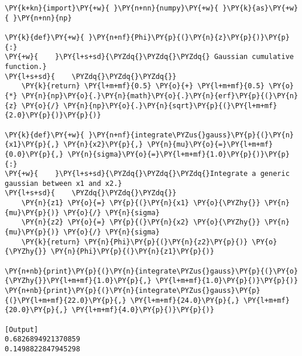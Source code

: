 \begin{Verbatim}[label=\makebox{\href{https://github.com/unipi-physics-labs/statnotes/tree/main/snippets/erf.py}{https://github.com/.../erf.py}},commandchars=\\\{\}]
\PY{k+kn}{import}\PY{+w}{ }\PY{n+nn}{numpy}\PY{+w}{ }\PY{k}{as}\PY{+w}{ }\PY{n+nn}{np}

\PY{k}{def}\PY{+w}{ }\PY{n+nf}{Phi}\PY{p}{(}\PY{n}{z}\PY{p}{)}\PY{p}{:}
\PY{+w}{    }\PY{l+s+sd}{\PYZdq{}\PYZdq{}\PYZdq{} Gaussian cumulative function.}
\PY{l+s+sd}{    \PYZdq{}\PYZdq{}\PYZdq{}}
    \PY{k}{return} \PY{l+m+mf}{0.5} \PY{o}{+} \PY{l+m+mf}{0.5} \PY{o}{*} \PY{n}{np}\PY{o}{.}\PY{n}{math}\PY{o}{.}\PY{n}{erf}\PY{p}{(}\PY{n}{z} \PY{o}{/} \PY{n}{np}\PY{o}{.}\PY{n}{sqrt}\PY{p}{(}\PY{l+m+mf}{2.0}\PY{p}{)}\PY{p}{)}

\PY{k}{def}\PY{+w}{ }\PY{n+nf}{integrate\PYZus{}gauss}\PY{p}{(}\PY{n}{x1}\PY{p}{,} \PY{n}{x2}\PY{p}{,} \PY{n}{mu}\PY{o}{=}\PY{l+m+mf}{0.0}\PY{p}{,} \PY{n}{sigma}\PY{o}{=}\PY{l+m+mf}{1.0}\PY{p}{)}\PY{p}{:}
\PY{+w}{    }\PY{l+s+sd}{\PYZdq{}\PYZdq{}\PYZdq{}Integrate a generic gaussian between x1 and x2.}
\PY{l+s+sd}{    \PYZdq{}\PYZdq{}\PYZdq{}}
    \PY{n}{z1} \PY{o}{=} \PY{p}{(}\PY{n}{x1} \PY{o}{\PYZhy{}} \PY{n}{mu}\PY{p}{)} \PY{o}{/} \PY{n}{sigma}
    \PY{n}{z2} \PY{o}{=} \PY{p}{(}\PY{n}{x2} \PY{o}{\PYZhy{}} \PY{n}{mu}\PY{p}{)} \PY{o}{/} \PY{n}{sigma}
    \PY{k}{return} \PY{n}{Phi}\PY{p}{(}\PY{n}{z2}\PY{p}{)} \PY{o}{\PYZhy{}} \PY{n}{Phi}\PY{p}{(}\PY{n}{z1}\PY{p}{)}

\PY{n+nb}{print}\PY{p}{(}\PY{n}{integrate\PYZus{}gauss}\PY{p}{(}\PY{o}{\PYZhy{}}\PY{l+m+mf}{1.0}\PY{p}{,} \PY{l+m+mf}{1.0}\PY{p}{)}\PY{p}{)}
\PY{n+nb}{print}\PY{p}{(}\PY{n}{integrate\PYZus{}gauss}\PY{p}{(}\PY{l+m+mf}{22.0}\PY{p}{,} \PY{l+m+mf}{24.0}\PY{p}{,} \PY{l+m+mf}{20.0}\PY{p}{,} \PY{l+m+mf}{4.0}\PY{p}{)}\PY{p}{)}

[Output]
0.6826894921370859
0.1498822847945298
\end{Verbatim}
